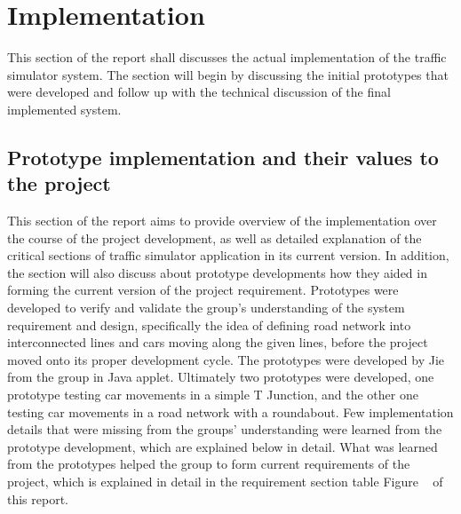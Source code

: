 \documentclass[11pt]{article}
\begin{document}
	
\section{Implementation} %
This section of the report shall discusses the actual implementation of the traffic simulator system. The section will begin by discussing the initial prototypes that were developed and follow up with the technical discussion of the final implemented system.

\subsection{Prototype implementation and their values to the project}
This section of the report aims to provide overview of the implementation over the course of the project development, as well as detailed explanation of the critical sections of traffic simulator application in its current version. In addition, the section will also discuss about prototype developments how they aided in forming the current version of the project requirement.
Prototypes were developed to verify and validate the group's understanding of the system requirement and design, specifically the idea of defining road network into interconnected lines and cars moving along the given lines, before the project moved onto its proper development cycle.
The prototypes were developed by Jie from the group in Java applet. Ultimately two prototypes were developed, one prototype testing car movements in a simple T Junction, and the other one testing car movements in a road network with a roundabout. Few implementation details that were missing from the groups' understanding were learned from the prototype development, which are explained below in detail. What was learned from the prototypes helped the group to form current requirements of the project, which is explained in detail in the requirement section table Figure ~\pageref{table:RequriementsTable} of this report.
\end{document}
